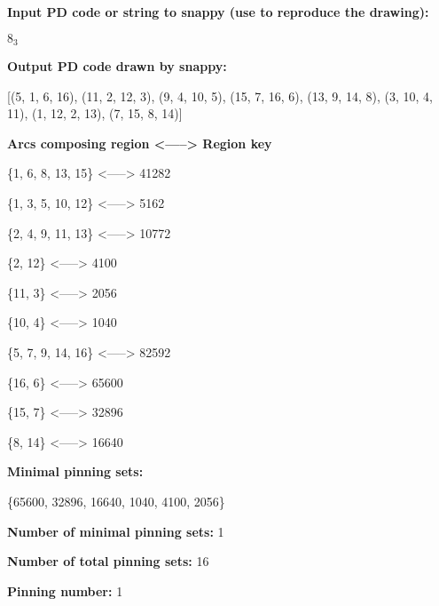\documentclass{article}%
\begin{document}
%
\small

\begin{multicols}{2}
\textbf{Input PD code or string to snappy (use to reproduce the drawing):}

	$8_3$

\textbf{Output PD code drawn by snappy:}

	[(5, 1, 6, 16), (11, 2, 12, 3), (9, 4, 10, 5), (15, 7, 16, 6), (13, 9, 14, 8), (3, 10, 4, 11), (1, 12, 2, 13), (7, 15, 8, 14)]


\textbf{Arcs composing region <-----> Region key}

\{{1, 6, 8, 13, 15}\} <-----> 41282

\{{1, 3, 5, 10, 12}\} <-----> 5162

\{{2, 4, 9, 11, 13}\} <-----> 10772

\{{2, 12}\} <-----> 4100

\{{11, 3}\} <-----> 2056

\{{10, 4}\} <-----> 1040

\{{5, 7, 9, 14, 16}\} <-----> 82592

\{{16, 6}\} <-----> 65600

\{{15, 7}\} <-----> 32896

\{{8, 14}\} <-----> 16640


\columnbreak

\textbf{Minimal pinning sets:}

\{{65600, 32896, 16640, 1040, 4100, 2056}\}



\textbf{Number of minimal pinning sets:} 1

\textbf{Number of total pinning sets:} 16

\textbf{Pinning number:} 1


\end{multicols}
\end{document}
